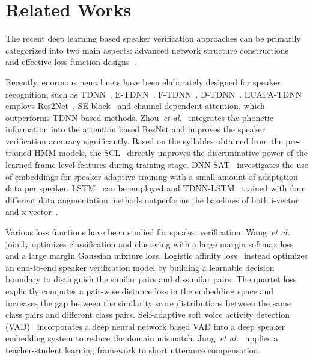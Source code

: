 \documentclass{article}
\def\etal{\emph{et al.}}
\begin{document}
\section{Related Works}\label{sec:related}
The recent deep learning based speaker verification approaches can be primarily categorized into two main aspects: advanced network structure constructions~\cite{snyder2018x,snyder2019speaker,villalba2019state,yu2020densely,desplanques2020ecapa} and effective loss function designs~\cite{liu2019large,peng2019logistic,wang2019joint,dhamyal2019optimizing}.

Recently, enormous neural nets have been elaborately designed for speaker recognition, such as TDNN~\cite{snyder2018x}, E-TDNN~\cite{snyder2019speaker}, F-TDNN~\cite{villalba2019state}, D-TDNN~\cite{yu2020densely}. ECAPA-TDNN~\cite{desplanques2020ecapa} employs Res2Net~\cite{gao2019res2net}, SE block~\cite{hu2018squeeze} and channel-dependent attention, which outperforms TDNN based methods. Zhou~\etal~\cite{zhou2019cnn} integrates the phonetic information into the attention based ResNet and improves the speaker verification accuracy significantly. Based on the syllables obtained from the pre-trained HMM models, the SCL~\cite{peng2019syllable} directly improves the discriminative power of the learned frame-level features during training stage. DNN-SAT~\cite{rownicka2019embeddings} investigates the use of embeddings for speaker-adaptive training with a small amount of adaptation data per speaker. LSTM~\cite{zhu2016co,huang2020cycle} can be employed and TDNN-LSTM~\cite{huang2019exploring,zhu2016co} trained with four different data augmentation methods outperforms the baselines of both i-vector~\cite{dehak2010front} and x-vector~\cite{snyder2018x}.  

Various loss functions have been studied for speaker verification. Wang~\etal~\cite{wang2019joint} jointly optimizes classification and clustering with a large margin softmax loss and a large margin Gaussian mixture loss. Logistic affinity loss~\cite{peng2019logistic} instead optimizes an end-to-end speaker verification model by building a learnable decision boundary to distinguish the similar pairs and dissimilar pairs. The quartet loss~\cite{dhamyal2019optimizing} explicitly computes a pair-wise distance loss in the embedding space and increases the gap between the similarity score distributions between the same class pairs and different class pairs. Self-adaptive soft voice activity detection (VAD)~\cite{jung2019self} incorporates a deep neural network based VAD into a deep speaker embedding system to reduce the domain mismatch. Jung~\etal~\cite{jung2019short} applies a teacher-student learning framework to short utterance compensation. 
\end{document}
